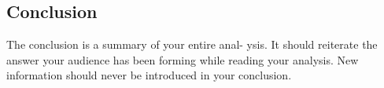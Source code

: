 \documentclass[11pt]{article}
\begin{document}
\begin{multicols}{2}


\section{Conclusion}
The conclusion is a summary of your entire anal- ysis. It should reiterate the answer your audience has been forming while reading your analysis. New information should never be introduced in your conclusion. \cite{texTemp}

\end{multicols}
\newpage





\end{document}
